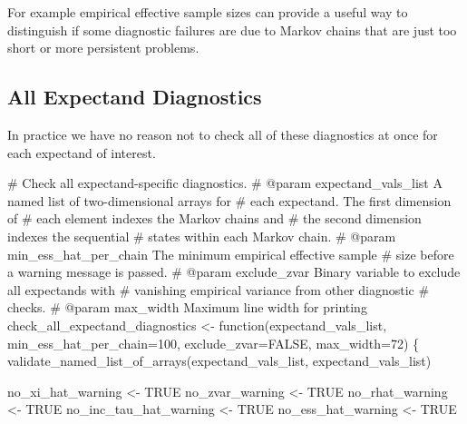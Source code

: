 \documentclass[
  letterpaper,
  DIV=11,
  numbers=noendperiod]{scrartcl}
\newenvironment{Shaded}{\begin{snugshade}}{\end{snugshade}}
\newcommand{\CommentTok}[1]{\textcolor[rgb]{0.37,0.37,0.37}{#1}}
\newcommand{\DecValTok}[1]{\textcolor[rgb]{0.68,0.00,0.00}{#1}}
\newcommand{\NormalTok}[1]{\textcolor[rgb]{0.00,0.23,0.31}{#1}}
\newcommand{\OperatorTok}[1]{\textcolor[rgb]{0.37,0.37,0.37}{#1}}
\newcommand{\StringTok}[1]{\textcolor[rgb]{0.13,0.47,0.30}{#1}}
\begin{document}
For example empirical effective sample sizes can provide a useful way to
distinguish if some diagnostic failures are due to Markov chains that
are just too short or more persistent problems.

\subsection{All Expectand Diagnostics}\label{all-expectand-diagnostics}

In practice we have no reason not to check all of these diagnostics at
once for each expectand of interest.

\begin{Shaded}
\begin{Highlighting}[]
\CommentTok{\# Check all expectand{-}specific diagnostics.}
\CommentTok{\# @param expectand\_vals\_list A named list of two{-}dimensional arrays for}
\CommentTok{\#                            each expectand.  The first dimension of}
\CommentTok{\#                            each element indexes the Markov chains and}
\CommentTok{\#                            the second dimension indexes the sequential}
\CommentTok{\#                            states within each Markov chain.}
\CommentTok{\# @param min\_ess\_hat\_per\_chain The minimum empirical effective sample}
\CommentTok{\#                              size before a warning message is passed.}
\CommentTok{\# @param exclude\_zvar Binary variable to exclude all expectands with}
\CommentTok{\#                     vanishing empirical variance from other diagnostic}
\CommentTok{\#                     checks.}
\CommentTok{\# @param max\_width Maximum line width for printing}
\NormalTok{check\_all\_expectand\_diagnostics }\OperatorTok{\textless{}{-}}\NormalTok{ function(expectand\_vals\_list,}
\NormalTok{                                            min\_ess\_hat\_per\_chain}\OperatorTok{=}\DecValTok{100}\NormalTok{,}
\NormalTok{                                            exclude\_zvar}\OperatorTok{=}\NormalTok{FALSE,}
\NormalTok{                                            max\_width}\OperatorTok{=}\DecValTok{72}\NormalTok{) \{}
\NormalTok{  validate\_named\_list\_of\_arrays(expectand\_vals\_list,}
                                \StringTok{\textquotesingle{}expectand\_vals\_list\textquotesingle{}}\NormalTok{)}
  
\NormalTok{  no\_xi\_hat\_warning }\OperatorTok{\textless{}{-}}\NormalTok{ TRUE}
\NormalTok{  no\_zvar\_warning }\OperatorTok{\textless{}{-}}\NormalTok{ TRUE}
\NormalTok{  no\_rhat\_warning }\OperatorTok{\textless{}{-}}\NormalTok{ TRUE}
\NormalTok{  no\_inc\_tau\_hat\_warning }\OperatorTok{\textless{}{-}}\NormalTok{ TRUE}
\NormalTok{  no\_ess\_hat\_warning }\OperatorTok{\textless{}{-}}\NormalTok{ TRUE}


\end{Highlighting}
\end{Shaded}
\end{document}
